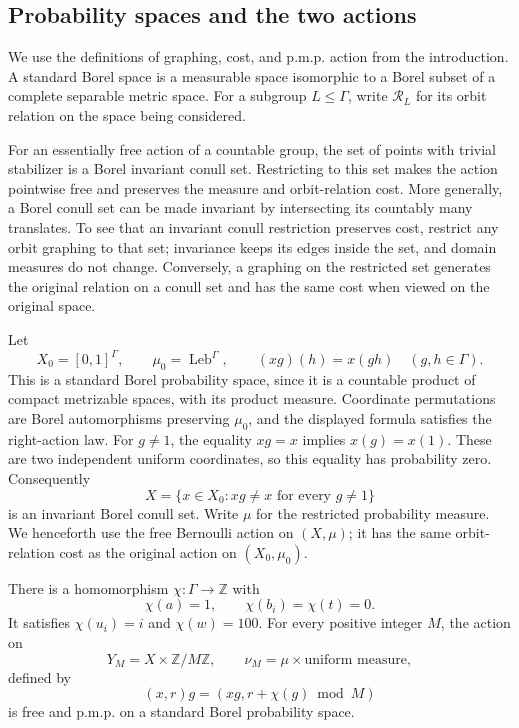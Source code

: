 \subsection{Probability spaces and the two actions}

We use the definitions of graphing, cost, and p.m.p. action from the
introduction. A standard Borel space is a measurable space isomorphic
to a Borel subset of a complete separable metric space. For a subgroup
$L\leq\Gamma$, write $\mathcal R_L$ for its orbit relation on the
space being considered.

For an essentially free action of a countable group, the set of points with trivial stabilizer is a Borel invariant
conull set.  Restricting
to this set makes the action pointwise free and preserves the measure
and orbit-relation cost.  More generally, a Borel conull set can be
made invariant by intersecting its countably many translates.
To see that an invariant conull restriction preserves cost, restrict
any orbit graphing to that set; invariance keeps its edges inside
the set, and domain measures do not change.  Conversely, a graphing
on the restricted set generates the original relation on a conull
set and has the same cost when viewed on the original space.

Let
\[
 X_0=[0,1]^\Gamma,\qquad
 \mu_0=\operatorname{Leb}^{\Gamma},\qquad
 (xg)(h)=x(gh)\quad(g,h\in\Gamma).
\]
This is a standard Borel probability space, since it is a countable
product of compact metrizable spaces, with its product measure.
Coordinate permutations are Borel automorphisms preserving $\mu_0$,
and the displayed formula satisfies the right-action law.  For
$g\ne1$, the equality $xg=x$ implies $x(g)=x(1)$.  These are two
independent uniform coordinates, so this equality has probability zero.
Consequently
\[
 X=\{x\in X_0:xg\ne x\text{ for every }g\ne1\}
\]
is an invariant Borel conull set.  Write $\mu$ for the restricted
probability measure.  We henceforth use the free Bernoulli action on
$(X,\mu)$; it has the same orbit-relation cost as the original action
on $(X_0,\mu_0)$.

\begin{lemma}
\label{actions:height}
There is a homomorphism $\chi:\Gamma\to\mathbb Z$ with
\[
 \chi(a)=1,\qquad \chi(b_i)=\chi(t)=0.
\]
It satisfies $\chi(u_i)=i$ and $\chi(w)=100$.
For every positive integer $M$, the action on
\[
 Y_M=X\times\mathbb Z/M\mathbb Z,
 \qquad \nu_M=\mu\times\text{uniform measure},
\]
defined by
\begin{equation}
 \label{actions:product-action}
 (x,r)g=(xg,r+\chi(g)\bmod M)
\end{equation}
is free and p.m.p. on a standard Borel probability space.
\end{lemma}

